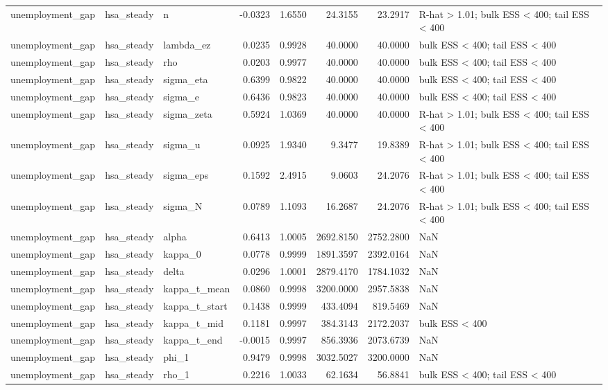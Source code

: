 \begin{tabular}{lllrrrrl}
unemployment\_gap & hsa\_steady & n & -0.0323 & 1.6550 & 24.3155 & 23.2917 & R-hat > 1.01; bulk ESS < 400; tail ESS < 400 \\
unemployment\_gap & hsa\_steady & lambda\_ez & 0.0235 & 0.9928 & 40.0000 & 40.0000 & bulk ESS < 400; tail ESS < 400 \\
unemployment\_gap & hsa\_steady & rho & 0.0203 & 0.9977 & 40.0000 & 40.0000 & bulk ESS < 400; tail ESS < 400 \\
unemployment\_gap & hsa\_steady & sigma\_eta & 0.6399 & 0.9822 & 40.0000 & 40.0000 & bulk ESS < 400; tail ESS < 400 \\
unemployment\_gap & hsa\_steady & sigma\_e & 0.6436 & 0.9823 & 40.0000 & 40.0000 & bulk ESS < 400; tail ESS < 400 \\
unemployment\_gap & hsa\_steady & sigma\_zeta & 0.5924 & 1.0369 & 40.0000 & 40.0000 & R-hat > 1.01; bulk ESS < 400; tail ESS < 400 \\
unemployment\_gap & hsa\_steady & sigma\_u & 0.0925 & 1.9340 & 9.3477 & 19.8389 & R-hat > 1.01; bulk ESS < 400; tail ESS < 400 \\
unemployment\_gap & hsa\_steady & sigma\_eps & 0.1592 & 2.4915 & 9.0603 & 24.2076 & R-hat > 1.01; bulk ESS < 400; tail ESS < 400 \\
unemployment\_gap & hsa\_steady & sigma\_N & 0.0789 & 1.1093 & 16.2687 & 24.2076 & R-hat > 1.01; bulk ESS < 400; tail ESS < 400 \\
unemployment\_gap & hsa\_steady & alpha & 0.6413 & 1.0005 & 2692.8150 & 2752.2800 & NaN \\
unemployment\_gap & hsa\_steady & kappa\_0 & 0.0778 & 0.9999 & 1891.3597 & 2392.0164 & NaN \\
unemployment\_gap & hsa\_steady & delta & 0.0296 & 1.0001 & 2879.4170 & 1784.1032 & NaN \\
unemployment\_gap & hsa\_steady & kappa\_t\_mean & 0.0860 & 0.9998 & 3200.0000 & 2957.5838 & NaN \\
unemployment\_gap & hsa\_steady & kappa\_t\_start & 0.1438 & 0.9999 & 433.4094 & 819.5469 & NaN \\
unemployment\_gap & hsa\_steady & kappa\_t\_mid & 0.1181 & 0.9997 & 384.3143 & 2172.2037 & bulk ESS < 400 \\
unemployment\_gap & hsa\_steady & kappa\_t\_end & -0.0015 & 0.9997 & 856.3936 & 2073.6739 & NaN \\
unemployment\_gap & hsa\_steady & phi\_1 & 0.9479 & 0.9998 & 3032.5027 & 3200.0000 & NaN \\
unemployment\_gap & hsa\_steady & rho\_1 & 0.2216 & 1.0033 & 62.1634 & 56.8841 & bulk ESS < 400; tail ESS < 400 \\

\end{tabular}
